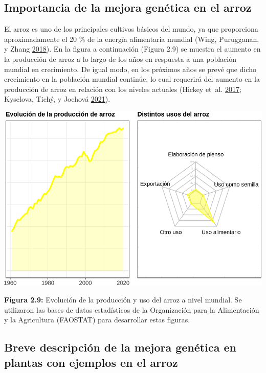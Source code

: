 \documentclass[11pt,spanish,a4paper,oneside,]{book} %
\begin{document}
\hypertarget{importancia-de-la-mejora-genuxe9tica-en-el-arroz}{%
\subsection{Importancia de la mejora genética en el arroz}\label{importancia-de-la-mejora-genuxe9tica-en-el-arroz}}

El arroz es uno de los principales cultivos básicos del mundo, ya que proporciona aproximadamente el 20 \% de la energía alimentaria mundial (Wing, Purugganan, y Zhang \protect\hyperlink{ref-cite:55}{2018}). En la figura a continuación (Figura 2.9) se muestra el aumento en la producción de arroz a lo largo de los años en respuesta a una población mundial en crecimiento. De igual modo, en los próximos años se prevé que dicho crecimiento en la población mundial continúe, lo cual requerirá del aumento en la producción de arroz en relación con los niveles actuales (Hickey et~al. \protect\hyperlink{ref-cite:44}{2017}; Kyselova, Tichý, y Jochová \protect\hyperlink{ref-cite:32}{2021}).

\begin{center}\includegraphics[width=1\linewidth]{figures/Graf_arroz} \end{center}

\textbf{Figura 2.9:} Evolución de la producción y uso del arroz a nivel mundial. Se utilizaron las bases de datos estadísticos de la Organización para la Alimentación y la Agricultura (FAOSTAT) para desarrollar estas figuras.

\hypertarget{breve-descripciuxf3n-de-la-mejora-genuxe9tica-en-plantas-con-ejemplos-en-el-arroz}{%
\subsection{Breve descripción de la mejora genética en plantas con ejemplos en el arroz}\label{breve-descripciuxf3n-de-la-mejora-genuxe9tica-en-plantas-con-ejemplos-en-el-arroz}}
\end{document}
